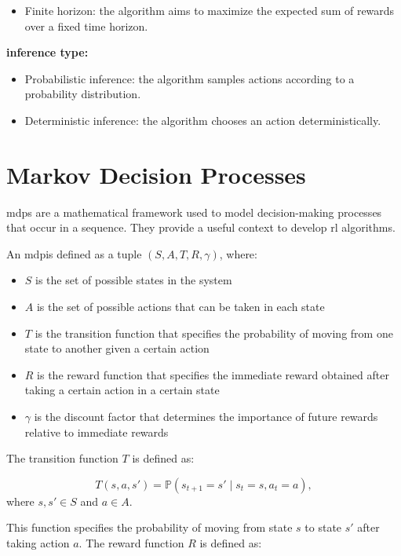 \begin{itemize}
\begin{itemize}
    \item Finite horizon: the algorithm aims to maximize the expected sum of rewards over a fixed time horizon.
    \end{itemize}
    \begin{samepage}
    \item \textbf{inference type:}
    \begin{itemize}
    \item Probabilistic inference: the algorithm samples actions according to a probability distribution.
    \item Deterministic inference: the algorithm chooses an action deterministically.
    \end{itemize}
\end{samepage}
\end{itemize}

\section{Markov Decision Processes}
\ac{mdp}s are a mathematical framework used to model decision-making processes that occur in a sequence. They provide a useful 
context to develop \ac{rl} algorithms.

An \ac{mdp}is defined as a tuple $( S, A, T, R, \gamma )$, where:
\begin{itemize}
    \item $S$ is the set of possible states in the system
    \item $A$ is the set of possible actions that can be taken in each state
    \item $T$ is the transition function that specifies the probability of moving from one state to another given a certain action
    \item $R$ is the reward function that specifies the immediate reward obtained after taking a certain action in a certain state
    \item $\gamma$ is the discount factor that determines the importance of future rewards relative to immediate rewards
\end{itemize}

The transition function $T$ is defined as:

$$T(s, a, s') = \mathbb{P}(s_{t+1}=s' \mid s_t=s, a_t=a),$$
where $s, s' \in S$ and $a \in A$.

This function specifies the probability of moving from state $s$ to state $s'$ after taking action $a$. The reward function $R$ is defined as:

